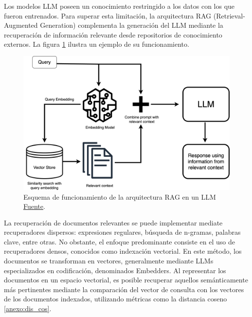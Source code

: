 Los modelos LLM poseen un conocimiento restringido a los datos con los que fueron entrenados. Para superar esta limitación, la arquitectura RAG (Retrieval-Augmented Generation) complementa la generación del LLM mediante la recuperación de información relevante desde repositorios de conocimiento externos. La figura \ref{fig:rag} ilustra un ejemplo de su funcionamiento.    

\begin{figure}[H]
  \centering
  \includegraphics[width=0.75\linewidth]{figures/RAG.png}
  \caption{Esquema de funcionamiento de la arquitectura RAG en un LLM \href{https://www.clarifai.com/blog/what-is-rag-retrieval-augmented-generation}{Fuente}.}
  \label{fig:rag}
\end{figure}

La recuperación de documentos relevantes se puede implementar mediate recuperadores dispersos: expresiones regulares, búsqueda de n-gramas, palabras clave, entre otras. No obstante, el enfoque predominante consiste en el uso de recuperadores densos, conocidos como indexación vectorial. En este método, los documentos se transforman en vectores, generalmente mediante LLMs especializados en codificación, denominados Embedders. Al representar los documentos en un espacio vectorial, es posible recuperar aquellos semánticamente más pertinentes mediante la comparación del vector de consulta con los vectores de los documentos indexados, utilizando métricas como la distancia coseno \ref{anexo:dis_cos}.

